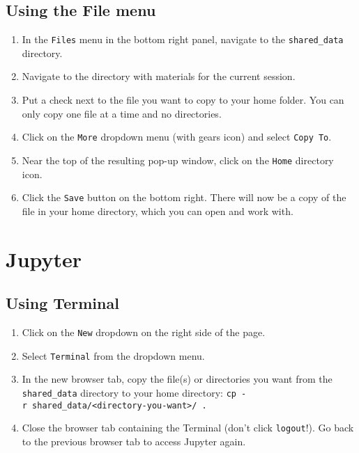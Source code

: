 \documentclass[]{book}
\providecommand{\tightlist}{%
  \setlength{\itemsep}{0pt}\setlength{\parskip}{0pt}}
\begin{document}
\hypertarget{using-the-file-menu}{%
\subsection{Using the File menu}\label{using-the-file-menu}}

\begin{enumerate}
\def\labelenumi{\arabic{enumi}.}
\tightlist
\item
  In the \texttt{Files} menu in the bottom right panel, navigate to the \texttt{shared\_data} directory.
\item
  Navigate to the directory with materials for the current session.
\item
  Put a check next to the file you want to copy to your home folder. You can only copy one file at a time and no directories.
\item
  Click on the \texttt{More} dropdown menu (with gears icon) and select \texttt{Copy\ To}.
\item
  Near the top of the resulting pop-up window, click on the \texttt{Home} directory icon.
\item
  Click the \texttt{Save} button on the bottom right. There will now be a copy of the file in your home directory, which you can open and work with.
\end{enumerate}

\hypertarget{jupyter-1}{%
\section{Jupyter}\label{jupyter-1}}

\hypertarget{using-terminal-1}{%
\subsection{Using Terminal}\label{using-terminal-1}}

\begin{enumerate}
\def\labelenumi{\arabic{enumi}.}
\tightlist
\item
  Click on the \texttt{New} dropdown on the right side of the page.
\item
  Select \texttt{Terminal} from the dropdown menu.
\item
  In the new browser tab, copy the file(s) or directories you want from the \texttt{shared\_data} directory to your home directory: \texttt{cp\ -r\ shared\_data/\textless{}directory-you-want\textgreater{}/\ .}
\item
  Close the browser tab containing the Terminal (don't click \texttt{logout}!). Go back to the previous browser tab to access Jupyter again.
\end{enumerate}
\end{document}

